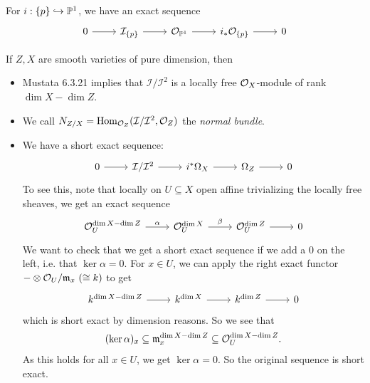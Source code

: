 \begin{example}
  For $i : \{p\} \hookrightarrow \mathbb{P}^1$,
  we have an exact sequence
  \[
    \begin{tikzcd}
      0 \ar[r] & \mathcal{I}_{\{p\}}
      \ar[r] & \OO_{\PP^1}
      \ar[r] & i_* \OO_{\{p\}}
      \ar[r] & 0
    \end{tikzcd}
  \]
\end{example}

\begin{remark}
  If $Z, X$ are smooth varieties of
  pure dimension, then
  \begin{itemize}
    \item Mustata 6.3.21 implies
      that $\mathcal{I} / \mathcal{I}^2$ is a locally free $\mathcal{O}_X$-module of rank $\dim X - \dim Z$.
    \item We call
      $N_{Z / X} = \operatorname{Hom}_{\mathcal{O}_Z}(\mathcal{I} / \mathcal{I}^2, \mathcal{O}_Z)$ the
      \emph{normal bundle}.
    \item We have a short exact sequence:
      \[
        \begin{tikzcd}
          0 \ar[r] & \mathcal{I} / \mathcal{I}^2
          \ar[r] & i^* \Omega_X
          \ar[r] & \Omega_Z
          \ar[r] & 0
        \end{tikzcd}
      \]
      To see this, note that locally
      on $U \subseteq X$ open affine
      trivializing the locally free sheaves,
      we get an exact sequence
      \[
        \begin{tikzcd}
          \OO_U^{\dim X - \dim Z}
          \ar[r, "\alpha"] & \OO_U^{\dim X}
          \ar[r, "\beta"] & \OO_U^{\dim Z}
          \ar[r] & 0
        \end{tikzcd}
      \]
      We want to check that we get
      a short exact sequence if we add a
      $0$ on the left, i.e. that $\ker \alpha = 0$.
      For $x \in U$, we can apply
      the right exact functor
      $- \otimes \mathcal{O}_U / \mathfrak{m}_x\ (\cong k)$ to get
      \[
        \begin{tikzcd}
          k^{\dim X - \dim Z}
          \ar[r] & k^{\dim X}
          \ar[r] & k^{\dim Z}
          \ar[r] & 0
        \end{tikzcd}
      \]
      which is short exact by dimension
      reasons. So we see that
      \[
        (\ker \alpha)_x
        \subseteq \mathfrak{m}_x^{\dim X - \dim Z}
        \subseteq \mathcal{O}_U^{\dim X - \dim Z}.
      \]
      As this holds for all $x \in U$,
      we get $\ker \alpha = 0$. So the
      original sequence is short exact.
  \end{itemize}
\end{remark}

